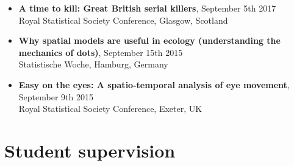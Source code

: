 \documentclass[10pt,a4paper]{moderncv}
\begin{document}
\begin{itemize}
    
    
    \item \textbf{A time to kill: Great British serial killers}, September 5th 2017\\
    { Royal Statistical Society Conference, Glasgow, Scotland}
    
    \item \textbf{Why spatial models are useful in ecology (understanding the mechanics of dots)}, September 15th 2015\\
    { Statistische Woche, Hamburg, Germany}
    
    \item \textbf{Easy on the eyes: A spatio-temporal analysis of eye movement}, September 9th 2015\\
    { Royal Statistical Society Conference, Exeter, UK}
    
    
\end{itemize}


\section{Student supervision}

\vspace{6pt}
\end{document}
